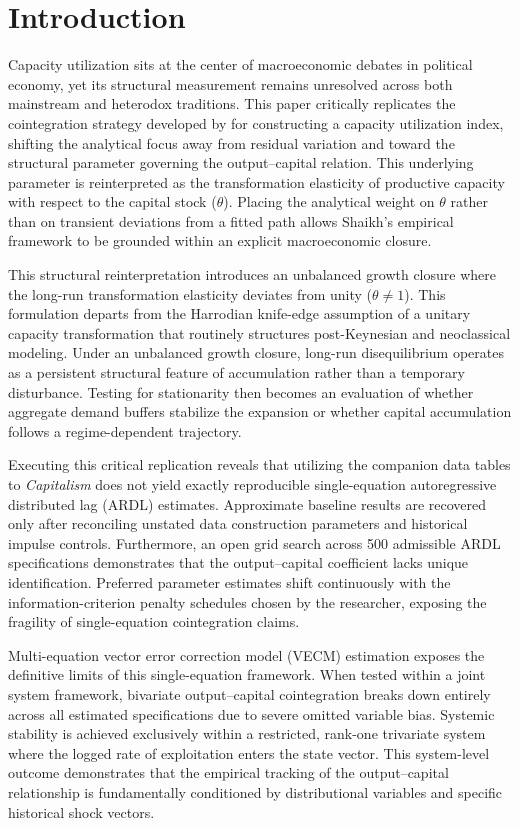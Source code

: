 \documentclass[11pt]{article}
\begin{document}
\section{Introduction}
\label{sec:introduction}

Capacity utilization sits at the center of macroeconomic debates in political economy, yet its structural measurement remains unresolved across both mainstream and heterodox traditions. This paper critically replicates the cointegration strategy developed by \citet{Shaikh2016} for constructing a capacity utilization index, shifting the analytical focus away from residual variation and toward the structural parameter governing the output--capital relation. This underlying parameter is reinterpreted as the transformation elasticity of productive capacity with respect to the capital stock ($\theta$). Placing the analytical weight on $\theta$ rather than on transient deviations from a fitted path allows Shaikh's empirical framework to be grounded within an explicit macroeconomic closure.

This structural reinterpretation introduces an unbalanced growth closure where the long-run transformation elasticity deviates from unity ($\theta \neq 1$). This formulation departs from the Harrodian knife-edge assumption of a unitary capacity transformation that routinely structures post-Keynesian and neoclassical modeling. Under an unbalanced growth closure, long-run disequilibrium operates as a persistent structural feature of accumulation rather than a temporary disturbance. Testing for stationarity then becomes an evaluation of whether aggregate demand buffers stabilize the expansion or whether capital accumulation follows a regime-dependent trajectory.

Executing this critical replication reveals that utilizing the companion data tables to \textit{Capitalism} does not yield exactly reproducible single-equation autoregressive distributed lag (ARDL) estimates. Approximate baseline results are recovered only after reconciling unstated data construction parameters and historical impulse controls. Furthermore, an open grid search across 500 admissible ARDL specifications demonstrates that the output--capital coefficient lacks unique identification. Preferred parameter estimates shift continuously with the information-criterion penalty schedules chosen by the researcher, exposing the fragility of single-equation cointegration claims.

Multi-equation vector error correction model (VECM) estimation exposes the definitive limits of this single-equation framework. When tested within a joint system framework, bivariate output--capital cointegration breaks down entirely across all estimated specifications due to severe omitted variable bias. Systemic stability is achieved exclusively within a restricted, rank-one trivariate system where the logged rate of exploitation enters the state vector. This system-level outcome demonstrates that the empirical tracking of the output--capital relationship is fundamentally conditioned by distributional variables and specific historical shock vectors.
\end{document}
